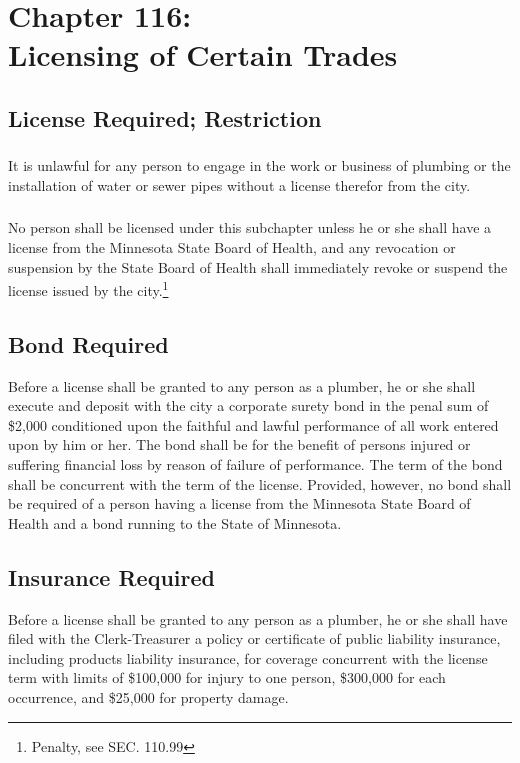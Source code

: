 \chapter*{Chapter 116: \\
	Licensing of Certain Trades}
    \vfill
    \minitoc
    \pagebreak


\section{License Required; Restriction}
\subsection{}
It is unlawful for any person to engage in the work or business of plumbing or the installation of water or sewer pipes without a license therefor from the city.
\subsection{}
No person shall be licensed under this subchapter unless he or she shall have a license from the Minnesota State Board of Health, and any revocation or suspension by the State Board of Health shall immediately revoke or suspend the license issued by the city.\footnote{Penalty, see SEC. 110.99}

\section{Bond Required}
Before a license shall be granted to any person as a plumber, he or she shall execute and deposit with the city a corporate surety bond in the penal sum of \$2,000 conditioned upon the faithful and lawful performance of all work entered upon by him or her. The bond shall be for the benefit of persons injured or suffering financial loss by reason of failure of performance. The term of the bond shall be concurrent with the term of the license. Provided, however, no bond shall be required of a person having a license from the Minnesota State Board of Health and a bond running to the State of Minnesota.

\section{Insurance Required}
Before a license shall be granted to any person as a plumber, he or she shall have filed with the Clerk-Treasurer a policy or certificate of public liability insurance, including products liability insurance, for coverage concurrent with the license term with limits of \$100,000 for injury to one person, \$300,000 for each occurrence, and \$25,000 for property damage.

